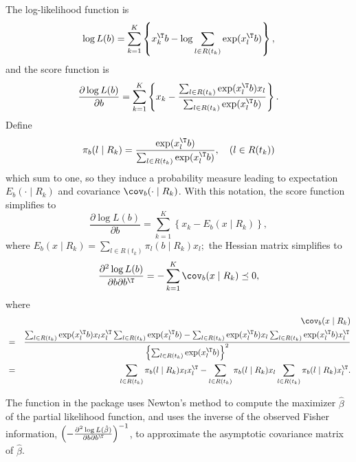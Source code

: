 The log-likelihood function is
\[
\log L( b )=\sum_{k=1}^{K}\left\{ x_{k}^{\T} b -\log\sum_{l\in R(t_{k})}\exp(x_{l}^{\T} b)\right\} ,
\]
and the score function is
\[
\frac{\partial\log L(b)}{\partial b}=\sum_{k=1}^{K}\left\{ x_{k}-\frac{\sum_{l\in R(t_{k})}\exp(x_{l}^{\T} b)x_{l}}{\sum_{l\in R(t_{k})}\exp(x_{l}^{\T} b)}\right\} .
\]
Define 
\[
\pi_{b}(l\mid R_{k})=  \frac{  \exp(x_{l}^{\T} b) }{  \sum_{l\in R(t_{k})}\exp(x_{l}^{\T} b) } ,\quad(l\in R(t_{k}))
\]
which sum to one, so they induce a probability measure leading to
expectation $E_{b}(\cdot\mid R_{k})$ and covariance $\cov_{b}(\cdot\mid R_{k})$.
With this notation, the score function simplifies to
\[
\frac{\partial\log L(b)}{\partial b}=\sum_{k=1}^{K}\left\{ x_{k}-E_{b}(x\mid R_{k})\right\} ,
\]
where 
$
E_{b}(x\mid R_{k}) = \sum_{l\in R(t_{k})}  \pi_{l}(b\mid R_{k}) x_l;
$
the Hessian matrix simplifies to
$$
\frac{\partial^{2}\log L(b)}{\partial b\partial b^{\T}}  =-\sum_{k=1}^{K}\cov_{b}(x\mid R_{k})\preceq 0,
$$
where
\begin{eqnarray*}
&&\cov_{b}(x\mid R_{k}) \\
&=& \frac{ 
\sum_{l\in R(t_{k})}\exp(x_{l}^{\T} b)x_{l}x_{l}^{\T}\sum_{l\in R(t_{k})}\exp(x_{l}^{\T} b) 
-\sum_{l\in R(t_{k})}\exp(x_{l}^{\T} b)x_{l}\sum_{l\in R(t_{k})}\exp(x_{l}^{\T} b)x_{l}^{\T} 
}
{  \left\{ \sum_{l\in R(t_{k})}\exp(x_{l}^{\T}b)\right\} ^{2} } \\
&=&
\sum_{l\in R(t_{k})}\pi_{b}(l\mid R_{k})x_{l}x_{l}^{\T}-\sum_{l\in R(t_{k})}\pi_{b}(l\mid R_{k})x_{l}\sum_{l\in R(t_{k})}\pi_{b}(l\mid R_{k})x_{l}^{\T} . 
\end{eqnarray*}
 

The  function in the  package  uses Newton's method to compute the maximizer $\hat{\beta}$ of the partial likelihood function, and uses the inverse of the observed Fisher information, $\left(  - \frac{\partial^{2}\log L( \hat\beta )}{\partial b\partial b^{\T}} \right)^{-1}$, to approximate the asymptotic covariance matrix of $\hat{\beta}$. 


